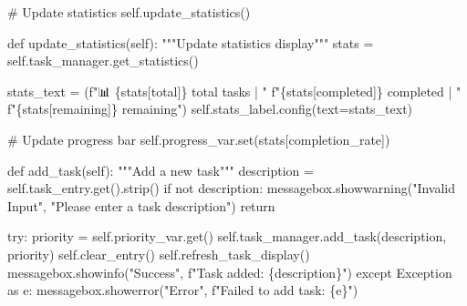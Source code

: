 \documentclass[
  letterpaper,
  DIV=11,
  numbers=noendperiod,
  oneside]{scrreprt}
\newenvironment{Shaded}{}{}
\newcommand{\BuiltInTok}[1]{\textcolor[rgb]{0.84,0.23,0.29}{#1}}
\newcommand{\CommentTok}[1]{\textcolor[rgb]{0.42,0.45,0.49}{#1}}
\newcommand{\ControlFlowTok}[1]{\textcolor[rgb]{0.84,0.23,0.29}{#1}}
\newcommand{\ImportTok}[1]{\textcolor[rgb]{0.01,0.18,0.38}{#1}}
\newcommand{\KeywordTok}[1]{\textcolor[rgb]{0.84,0.23,0.29}{#1}}
\newcommand{\NormalTok}[1]{\textcolor[rgb]{0.14,0.16,0.18}{#1}}
\newcommand{\OperatorTok}[1]{\textcolor[rgb]{0.14,0.16,0.18}{#1}}
\newcommand{\PreprocessorTok}[1]{\textcolor[rgb]{0.84,0.23,0.29}{#1}}
\newcommand{\SpecialCharTok}[1]{\textcolor[rgb]{0.00,0.36,0.77}{#1}}
\newcommand{\SpecialStringTok}[1]{\textcolor[rgb]{0.01,0.18,0.38}{#1}}
\newcommand{\StringTok}[1]{\textcolor[rgb]{0.01,0.18,0.38}{#1}}
\newcommand{\VariableTok}[1]{\textcolor[rgb]{0.89,0.38,0.04}{#1}}
\begin{document}
\begin{Shaded}
\begin{Highlighting}[]
        \CommentTok{\# Update statistics}
        \VariableTok{self}\NormalTok{.update\_statistics()}
    
    \KeywordTok{def}\NormalTok{ update\_statistics(}\VariableTok{self}\NormalTok{):}
        \CommentTok{"""Update statistics display"""}
\NormalTok{        stats }\OperatorTok{=} \VariableTok{self}\NormalTok{.task\_manager.get\_statistics()}
        
\NormalTok{        stats\_text }\OperatorTok{=}\NormalTok{ (}\SpecialStringTok{f"📊 }\SpecialCharTok{\{}\NormalTok{stats[}\StringTok{\textquotesingle{}total\textquotesingle{}}\NormalTok{]}\SpecialCharTok{\}}\SpecialStringTok{ total tasks | "}
                     \SpecialStringTok{f"}\SpecialCharTok{\{}\NormalTok{stats[}\StringTok{\textquotesingle{}completed\textquotesingle{}}\NormalTok{]}\SpecialCharTok{\}}\SpecialStringTok{ completed | "}
                     \SpecialStringTok{f"}\SpecialCharTok{\{}\NormalTok{stats[}\StringTok{\textquotesingle{}remaining\textquotesingle{}}\NormalTok{]}\SpecialCharTok{\}}\SpecialStringTok{ remaining"}\NormalTok{)}
        \VariableTok{self}\NormalTok{.stats\_label.config(text}\OperatorTok{=}\NormalTok{stats\_text)}
        
        \CommentTok{\# Update progress bar}
        \VariableTok{self}\NormalTok{.progress\_var.}\BuiltInTok{set}\NormalTok{(stats[}\StringTok{\textquotesingle{}completion\_rate\textquotesingle{}}\NormalTok{])}
    
    \KeywordTok{def}\NormalTok{ add\_task(}\VariableTok{self}\NormalTok{):}
        \CommentTok{"""Add a new task"""}
\NormalTok{        description }\OperatorTok{=} \VariableTok{self}\NormalTok{.task\_entry.get().strip()}
        \ControlFlowTok{if} \KeywordTok{not}\NormalTok{ description:}
\NormalTok{            messagebox.showwarning(}\StringTok{"Invalid Input"}\NormalTok{, }\StringTok{"Please enter a task description"}\NormalTok{)}
            \ControlFlowTok{return}
        
        \ControlFlowTok{try}\NormalTok{:}
\NormalTok{            priority }\OperatorTok{=} \VariableTok{self}\NormalTok{.priority\_var.get()}
            \VariableTok{self}\NormalTok{.task\_manager.add\_task(description, priority)}
            \VariableTok{self}\NormalTok{.clear\_entry()}
            \VariableTok{self}\NormalTok{.refresh\_task\_display()}
\NormalTok{            messagebox.showinfo(}\StringTok{"Success"}\NormalTok{, }\SpecialStringTok{f"Task added: }\SpecialCharTok{\{}\NormalTok{description}\SpecialCharTok{\}}\SpecialStringTok{"}\NormalTok{)}
        \ControlFlowTok{except} \PreprocessorTok{Exception} \ImportTok{as}\NormalTok{ e:}
\NormalTok{            messagebox.showerror(}\StringTok{"Error"}\NormalTok{, }\SpecialStringTok{f"Failed to add task: }\SpecialCharTok{\{}\NormalTok{e}\SpecialCharTok{\}}\SpecialStringTok{"}\NormalTok{)}
    

\end{Highlighting}
\end{Shaded}
\end{document}
